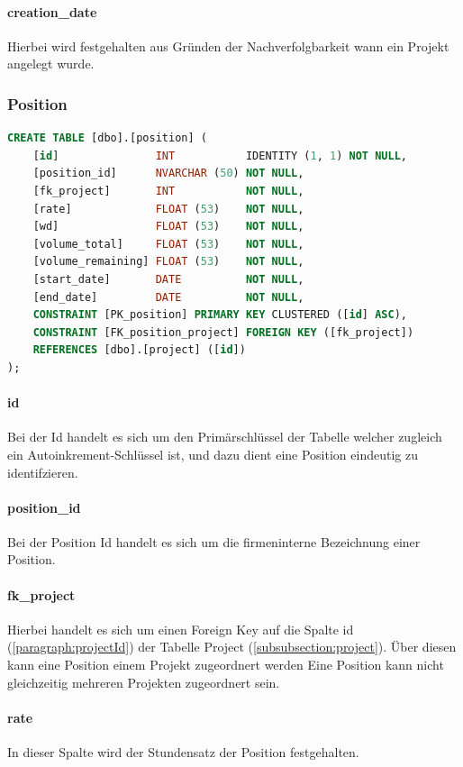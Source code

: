 \documentclass{article}
\begin{document}
\paragraph{creation\_date} Hierbei wird festgehalten aus Gründen der Nachverfolgbarkeit wann ein Projekt
angelegt wurde.

\subsubsection{Position}
\label{subsubsection:Position}
\begin{lstlisting}[language=Sql, caption= Create Table Statement für Position Table]
    CREATE TABLE [dbo].[position] (
    [id]               INT           IDENTITY (1, 1) NOT NULL,
    [position_id]      NVARCHAR (50) NOT NULL,
    [fk_project]       INT           NOT NULL,
    [rate]             FLOAT (53)    NOT NULL,
    [wd]               FLOAT (53)    NOT NULL,
    [volume_total]     FLOAT (53)    NOT NULL,
    [volume_remaining] FLOAT (53)    NOT NULL,
    [start_date]       DATE          NOT NULL,
    [end_date]         DATE          NOT NULL,
    CONSTRAINT [PK_position] PRIMARY KEY CLUSTERED ([id] ASC),
    CONSTRAINT [FK_position_project] FOREIGN KEY ([fk_project]) 
    REFERENCES [dbo].[project] ([id])
);
         \end{lstlisting}
\paragraph{id}
\label{paragraph:positionId}
Bei der Id handelt es sich um den Primärschlüssel der Tabelle welcher zugleich
ein Autoinkrement-Schlüssel ist, und dazu dient eine Position eindeutig zu
identifzieren.

\paragraph{position\_id} Bei der Position Id handelt es sich um die firmeninterne Bezeichnung einer
Position.
\paragraph{fk\_project} Hierbei handelt es sich um einen Foreign Key auf die Spalte id
(\ref{paragraph:projectId}) der Tabelle Project
({\ref{subsubsection:project}}). Über diesen kann eine Position einem Projekt
zugeordnert werden Eine Position kann nicht gleichzeitig mehreren Projekten
zugeordnert sein.
\paragraph{rate} In dieser Spalte wird der Stundensatz der Position festgehalten.
\end{document}
